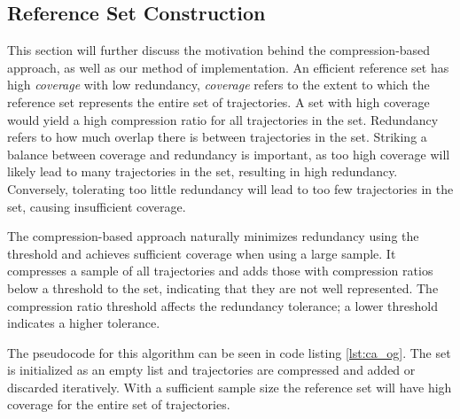 \subsection{Reference Set Construction}
This section will further discuss the motivation behind the compression-based approach, as well as our method of implementation. An efficient reference set has high \textit{coverage} with low redundancy, \textit{coverage} refers to the extent to which the reference set represents the entire set of trajectories. A set with high coverage would yield a high compression ratio for all trajectories in the set. Redundancy refers to how much overlap there is between trajectories in the set. Striking a balance between coverage and redundancy is important, as too high coverage will likely lead to many trajectories in the set, resulting in high redundancy. Conversely, tolerating too little redundancy will lead to too few trajectories in the set, causing insufficient coverage.

The compression-based approach naturally minimizes redundancy using the threshold and achieves sufficient coverage when using a large sample. It compresses a sample of all trajectories and adds those with compression ratios below a threshold to the set, indicating that they are not well represented. The compression ratio threshold affects the redundancy tolerance; a lower threshold indicates a higher tolerance.

The pseudocode for this algorithm can be seen in code listing \ref{lst:ca_og}. The set is initialized as an empty list and trajectories are compressed and added or discarded iteratively. With a sufficient sample size the reference set will have high coverage for the entire set of trajectories.


